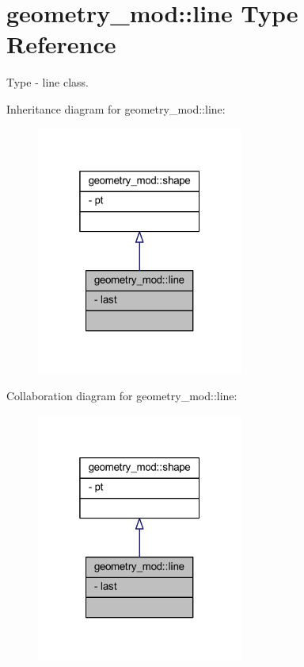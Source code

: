 \hypertarget{structgeometry__mod_1_1line}{}\section{geometry\+\_\+mod\+:\+:line Type Reference}
\label{structgeometry__mod_1_1line}


Type -\/ line class.  




Inheritance diagram for geometry\+\_\+mod\+:\+:line\+:
\nopagebreak
\begin{figure}[H]
\begin{center}
\leavevmode
\includegraphics[width=193pt]{structgeometry__mod_1_1line__inherit__graph}
\end{center}
\end{figure}


Collaboration diagram for geometry\+\_\+mod\+:\+:line\+:
\nopagebreak
\begin{figure}[H]
\begin{center}
\leavevmode
\includegraphics[width=193pt]{structgeometry__mod_1_1line__coll__graph}
\end{center}
\end{figure}

